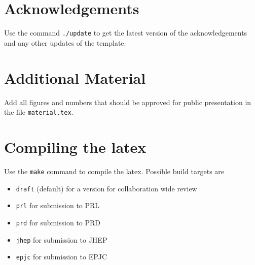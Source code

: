 \section{Acknowledgements}
Use the command \texttt{./update} to get the latest version of the acknowledgements and any other updates of the template.

\section{Additional Material}
Add all figures and numbers that should be approved for public presentation in the file \texttt{material.tex}.

\section{Compiling the latex}
Use the \texttt{make} command to compile the latex.
Possible build targets are
\begin{itemize}
\item \texttt{draft} (default) for a version for collaboration wide review
\item \texttt{prl} for submission to PRL
\item \texttt{prd} for submission to PRD
\item \texttt{jhep} for submission to JHEP
\item \texttt{epjc} for submission to EPJC
\end{itemize}
